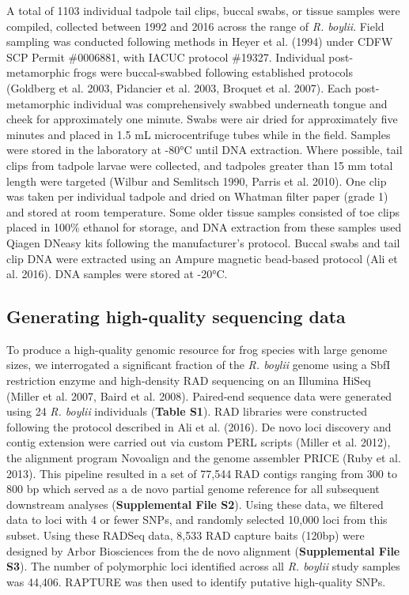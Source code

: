\documentclass[twoside,12pt,final]{ucthesis-CA2012} %
\begin{document}
\begin{ucmainmatter}
A total of 1103 individual tadpole tail clips, buccal swabs, or tissue
samples were compiled, collected between 1992 and 2016 across the range
of \emph{R. boylii}. Field sampling was conducted following methods in
Heyer et al. (1994) under CDFW SCP Permit \#0006881, with IACUC protocol
\#19327. Individual post-metamorphic frogs were buccal-swabbed following
established protocols (Goldberg et al. 2003, Pidancier et al. 2003,
Broquet et al. 2007). Each post-metamorphic individual was
comprehensively swabbed underneath tongue and cheek for approximately
one minute. Swabs were air dried for approximately five minutes and
placed in 1.5 mL microcentrifuge tubes while in the field. Samples were
stored in the laboratory at -80°C until DNA extraction. Where possible,
tail clips from tadpole larvae were collected, and tadpoles greater than
15 mm total length were targeted (Wilbur and Semlitsch 1990, Parris et
al. 2010). One clip was taken per individual tadpole and dried on
Whatman filter paper (grade 1) and stored at room temperature. Some
older tissue samples consisted of toe clips placed in 100\% ethanol for
storage, and DNA extraction from these samples used Qiagen DNeasy kits
following the manufacturer's protocol. Buccal swabs and tail clip DNA
were extracted using an Ampure magnetic bead-based protocol (Ali et al.
2016). DNA samples were stored at -20°C.

\hypertarget{generating-high-quality-sequencing-data}{%
\subsection{Generating high-quality sequencing
data}\label{generating-high-quality-sequencing-data}}

To produce a high-quality genomic resource for frog species with large
genome sizes, we interrogated a significant fraction of the \emph{R.
boylii} genome using a SbfI restriction enzyme and high-density RAD
sequencing on an Illumina HiSeq (Miller et al. 2007, Baird et al. 2008).
Paired-end sequence data were generated using 24 \emph{R. boylii}
individuals (\textbf{Table S1}). RAD libraries were constructed
following the protocol described in Ali et al. (2016). De novo loci
discovery and contig extension were carried out via custom PERL scripts
(Miller et al. 2012), the alignment program Novoalign and the genome
assembler PRICE (Ruby et al. 2013). This pipeline resulted in a set of
77,544 RAD contigs ranging from 300 to 800 bp which served as a de novo
partial genome reference for all subsequent downstream analyses
(\textbf{Supplemental File S2}). Using these data, we filtered data to
loci with 4 or fewer SNPs, and randomly selected 10,000 loci from this
subset. Using these RADSeq data, 8,533 RAD capture baits (120bp) were
designed by Arbor Biosciences from the de novo alignment
(\textbf{Supplemental File S3}). The number of polymorphic loci
identified across all \emph{R. boylii} study samples was 44,406. RAPTURE
was then used to identify putative high-quality SNPs.


\end{ucmainmatter}
\end{document}
